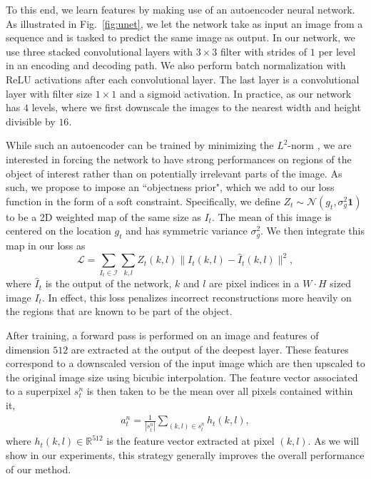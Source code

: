 To this end, we learn features by making use of an autoencoder neural network. As illustrated in Fig.~\ref{fig:unet}, we let the network take as input an image from a sequence and is tasked to predict the same image as output. In our network, we use three stacked convolutional layers with $3 \times 3$ filter with strides of $1$ per level in an encoding and decoding path. We also perform batch normalization with ReLU activations after each convolutional layer. The last layer is a convolutional layer with filter size $1 \times 1$ and a sigmoid activation. In practice, as our network has $4$ levels, where we first downscale the images to the nearest width and height divisible by $16$.

While such an autoencoder can be trained by minimizing the $L^2$-norm \cite{vincent08}, we are interested in forcing the network to have strong performances on regions of the object of interest rather than on potentially irrelevant parts of the image. As such, we propose to impose an ``objectness prior", which we add to our loss function in the form of a soft constraint. Specifically, we define ${Z}_t \sim \mathcal{N}(g_t, \sigma_g^2\bm{1})$ to be a 2D weighted map of the same size as $I_t$. The mean of this image is centered on the location $g_t$ and has symmetric variance $\sigma_g^2$. We then integrate this map in our loss as
\begin{equation}
\mathcal{L} = \sum_{{I}_t \in \mathcal{I}} \sum_{k,l} {Z}_t(k,l) \| I_t(k,l) - {\hat{I}}_t(k,l)\|^2,
\label{eq:loss_features}
\end{equation}
\noindent
where $\hat{I}_t$ is the output of the network, $k$ and $l$ are pixel indices in a $W \cdot H$ sized image $I_t$. In effect, this loss penalizes incorrect reconstructions  more heavily on the regions that are known to be part of the object.

After training, a forward pass is performed on an image and features of dimension $512$ are extracted at the output of the deepest layer. These features correspond to a downscaled version of the input image which are then upscaled to the original image size using bicubic interpolation. The feature vector associated to a superpixel $s_t^n$ is then taken to be the mean over all pixels contained within it,
\begin{equation}
\begin{split}
  a_t^n = \frac{1}{|s_t^n|} \sum_{(k,l) \in s_t^n}h_t(k,l),
\end{split}
\label{eq:app_vector}
\end{equation}
\noindent
where $h_t(k,l) \in \mathbb{R}^{512}$ is the feature vector extracted at pixel $(k,l)$. As we will show in our experiments, this strategy generally improves the overall performance of our method.


